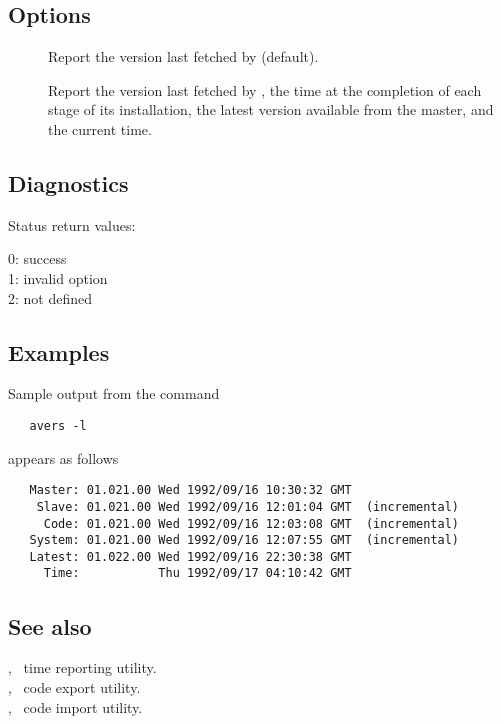 \subsection*{Options}

\begin{description}
\item[]
   Report the version last fetched by  (default).

\item[]
   Report the version last fetched by , the time at the
   completion of each stage of its installation, the latest version available
   from the master, and the current time.
\end{description}

\subsection*{Diagnostics}

Status return values:
\begin{status}
   0: success\\
   1: invalid option\\
   2:  not defined
\end{status}

\subsection*{Examples}

Sample output from the command

\begin{verbatim}
   avers -l
\end{verbatim}

\noindent
appears as follows

\begin{verbatim}
   Master: 01.021.00 Wed 1992/09/16 10:30:32 GMT
    Slave: 01.021.00 Wed 1992/09/16 12:01:04 GMT  (incremental)
     Code: 01.021.00 Wed 1992/09/16 12:03:08 GMT  (incremental)
   System: 01.021.00 Wed 1992/09/16 12:07:55 GMT  (incremental)
   Latest: 01.022.00 Wed 1992/09/16 22:30:38 GMT
     Time:           Thu 1992/09/17 04:10:42 GMT
\end{verbatim}

\subsection*{See also}

, \aipspp\ time reporting utility.\\
, \aipspp\ code export utility.\\
, \aipspp\ code import utility.

